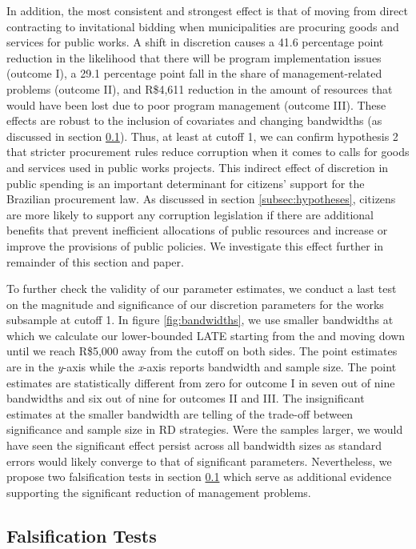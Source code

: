 \documentclass[11pt]{article}
\begin{document}
In addition, the most consistent and strongest effect is that of moving from direct contracting to invitational bidding when municipalities are procuring goods and services for public works. A shift in discretion causes a 41.6 percentage point reduction in the likelihood that there will be program implementation issues (outcome I), a 29.1 percentage point fall in the share of management-related problems (outcome II), and R\$4,611 reduction in the amount of resources that would have been lost due to poor program management (outcome III). These effects are robust to the inclusion of covariates and changing bandwidths (as discussed in section \ref{subsec:discussion}). Thus, at least at cutoff 1, we can confirm hypothesis 2 that stricter procurement rules reduce corruption when it comes to calls for goods and services used in public works projects. This indirect effect of discretion in public spending is an important determinant for citizens' support for the Brazilian procurement law. As discussed in section \ref{subsec:hypotheses}, citizens are more likely to support any corruption legislation if there are additional benefits that prevent inefficient allocations of public resources and increase or improve the provisions of public policies. We investigate this effect further in remainder of this section and paper.

To further check the validity of our parameter estimates, we conduct a last test on the magnitude and significance of our discretion parameters for the works subsample at cutoff 1. In figure \ref{fig:bandwidths}, we use smaller bandwidths at which we calculate our lower-bounded LATE starting from the \citet{CalonicoOptimalDataDrivenRegression2015} and moving down until we reach R\$5,000 away from the cutoff on both sides. The point estimates are in the \emph{y}-axis while the \emph{x}-axis reports bandwidth and sample size. The point estimates are statistically different from zero for outcome I in seven out of nine bandwidths and six out of nine for outcomes II and III. The insignificant estimates at the smaller bandwidth are telling of the trade-off between significance and sample size in RD strategies. Were the samples larger, we would have seen the significant effect persist across all bandwidth sizes as standard errors would likely converge to that of significant parameters. Nevertheless, we propose two falsification tests in section \ref{subsec:discussion} which serve as additional evidence supporting the significant reduction of management problems.

\subsection{Falsification Tests} \label{subsec:discussion}
\end{document}
